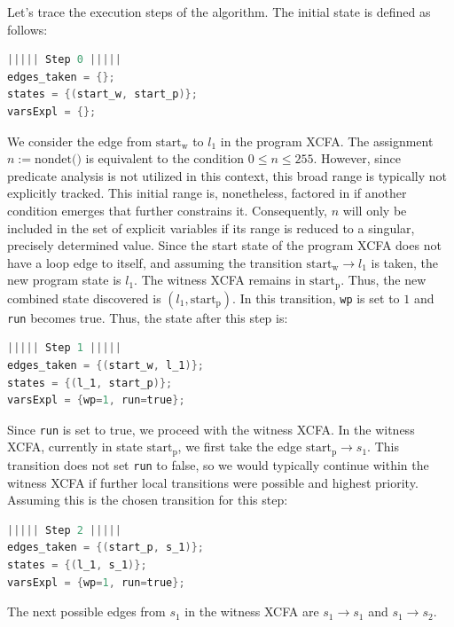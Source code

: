 Let's trace the execution steps of the algorithm.
The initial state is defined as follows:
\begin{lstlisting}[style=C, language=C, basicstyle=\ttfamily\footnotesize, columns=flexible,
    breaklines=true, breakatwhitespace=true, tabsize=2, showstringspaces=false]
||||| Step 0 |||||
edges_taken = {};
states = {(start_w, start_p)}; 
varsExpl = {}; 
\end{lstlisting}
We consider the edge from $\text{start}_\text{w}$ to $l_1$ in the program XCFA.
The assignment $n := \text{nondet()}$ is equivalent to the condition $0 \le n \le 255$.
However, since predicate analysis is not utilized in this context, this broad range is
typically not explicitly tracked. This initial range is, nonetheless, factored in if another
condition emerges that further constrains it. Consequently, $n$ will only be included in the
set of explicit variables if its range is reduced to a singular, precisely determined value.
Since the start state of the program XCFA does not have a loop edge to itself, and assuming the
transition $\text{start}_\text{w} \to l_1$ is taken, the new program state is $l_1$.
The witness XCFA remains in $\text{start}_\text{p}$.
Thus, the new combined state discovered is $(l_1, \text{start}_\text{p})$.
In this transition, \texttt{wp} is set to $1$ and \texttt{run} becomes true.
Thus, the state after this step is:
\begin{lstlisting}[style=C, language=C, basicstyle=\ttfamily\footnotesize, columns=flexible,
    breaklines=true, breakatwhitespace=true, tabsize=2, showstringspaces=false]
||||| Step 1 |||||
edges_taken = {(start_w, l_1)};
states = {(l_1, start_p)}; 
varsExpl = {wp=1, run=true}; 
\end{lstlisting}
Since \texttt{run} is set to true, we proceed with the witness XCFA.
In the witness XCFA, currently in state $\text{start}_\text{p}$, we first take the edge
$\text{start}_\text{p} \to s_1$. This transition does not set \texttt{run} to false,
so we would typically continue within the witness XCFA if further local transitions were possible
and highest priority. Assuming this is the chosen transition for this step:
\begin{lstlisting}[style=C, language=C, basicstyle=\ttfamily\footnotesize, columns=flexible,
    breaklines=true, breakatwhitespace=true, tabsize=2, showstringspaces=false]
||||| Step 2 |||||
edges_taken = {(start_p, s_1)};
states = {(l_1, s_1)}; 
varsExpl = {wp=1, run=true}; 
\end{lstlisting}
The next possible edges from $s_1$ in the witness XCFA are $s_1 \to s_1$ and $s_1 \to s_2$.
